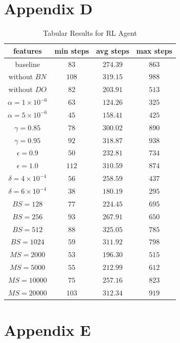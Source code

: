 \documentclass[letterpaper]{article} %
\begin{document}
  \section{Appendix D}
  \begin{table}[h!]
    \centering
    \normalsize{
      \begin{spacing}{1.9}
      \begin{tabular}{ |cccc| } 
        \hline
        features & min steps & avg steps & max steps  \\ 
        \hline
        \hline
        baseline & $83$& $274.39$ & $863$\\
        without $BN$&$108$&$319.15$&$988$\\
        without $DO$&$82$&$203.91$&$513$\\
        $\alpha=1\times 10^{-6}$&$63$&$124.26$&$325$\\
        $\alpha=5\times 10^{-6}$&$45$&$158.41$&$425$\\
        $\gamma=0.85$&$78$&$300.02$&$890$\\
        $\gamma=0.95$&$92$&$318.87$&$938$\\
        $\epsilon=0.9$&$50$&$232.81$&$734$\\
        $\epsilon=1.0$&$112$&$310.59$&$874$\\
        $\delta= 4\times 10^{-4}$&$56$&$258.59$&$437$\\
        $\delta= 6\times 10^{-4}$&$38$&$180.19$&$295$\\
        $BS=128$&$77$&$224.45$&$695$\\
        $BS=256$&$93$&$267.91$&$650$\\
        $BS=512$&$88$&$325.05$&$785$\\
        $BS=1024$&$59$&$311.92$&$798$\\
        $MS=2000$&$53$&$196.30$&$515$\\
        $MS=5000$&$55$&$212.99$&$612$\\
        $MS=10000$&$75$&$257.16$&$823$\\
        $MS=20000$&$103$&$312.34$&$919$\\
        \hline
      \end{tabular}
    \end{spacing}
    }
    \caption{Tabular Results for RL Agent}
    \label{tab:tabularResult}
  \end{table}  
  \newpage
  \section{Appendix E}
\end{document}
